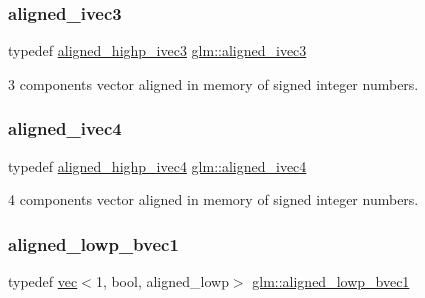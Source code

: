 \subsubsection{\texorpdfstring{aligned\+\_\+ivec3}{aligned\_ivec3}}
{\footnotesize\ttfamily typedef \hyperlink{group__gtc__type__aligned_gaa469d8bf0cb9ae640c943d847ec48f95}{aligned\+\_\+highp\+\_\+ivec3} \hyperlink{group__gtc__type__aligned_gabbf85e492d39baef3a418c15c996ab65}{glm\+::aligned\+\_\+ivec3}}



3 components vector aligned in memory of signed integer numbers. 

\mbox{\label{group__gtc__type__aligned_gaa33169a30c7d22a8648f20b4534f635f}} 
\subsubsection{\texorpdfstring{aligned\+\_\+ivec4}{aligned\_ivec4}}
{\footnotesize\ttfamily typedef \hyperlink{group__gtc__type__aligned_gabbac4883efc1760f4efb450753794f2d}{aligned\+\_\+highp\+\_\+ivec4} \hyperlink{group__gtc__type__aligned_gaa33169a30c7d22a8648f20b4534f635f}{glm\+::aligned\+\_\+ivec4}}



4 components vector aligned in memory of signed integer numbers. 

\mbox{\label{group__gtc__type__aligned_ga188725767d0c2d0331f89574c543e600}} 
\subsubsection{\texorpdfstring{aligned\+\_\+lowp\+\_\+bvec1}{aligned\_lowp\_bvec1}}
{\footnotesize\ttfamily typedef \hyperlink{structglm_1_1vec}{vec}$<$1, bool, aligned\+\_\+lowp$>$ \hyperlink{group__gtc__type__aligned_ga188725767d0c2d0331f89574c543e600}{glm\+::aligned\+\_\+lowp\+\_\+bvec1}}



